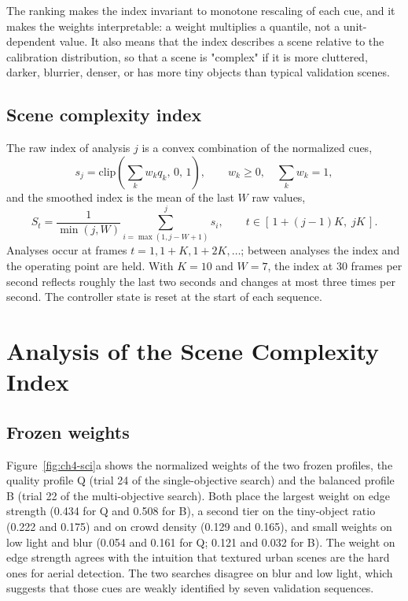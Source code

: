 The ranking makes the index invariant to monotone rescaling of each cue, and it makes the weights interpretable: a weight multiplies a quantile, not a unit-dependent value. It also means that the index describes a scene relative to the calibration distribution, so that a scene is "complex" if it is more cluttered, darker, blurrier, denser, or has more tiny objects than typical validation scenes.

\subsection{Scene complexity index}
The raw index of analysis $j$ is a convex combination of the normalized cues,
\begin{equation}
s_j = \mathrm{clip}\left(\sum_{k} w_k q_k,\, 0,\, 1\right), \qquad w_k \ge 0,\quad \sum_k w_k = 1,
\label{eq:ch4-sci}
\end{equation}
and the smoothed index is the mean of the last $W$ raw values,
\begin{equation}
S_t = \frac{1}{\min(j,W)} \sum_{i=\max(1,j-W+1)}^{j} s_i, \qquad t \in [\,1+(j-1)K,\; jK\,].
\label{eq:ch4-smooth}
\end{equation}
Analyses occur at frames $t=1, 1+K, 1+2K, \ldots$; between analyses the index and the operating point are held. With $K=10$ and $W=7$, the index at 30 frames per second reflects roughly the last two seconds and changes at most three times per second. The controller state is reset at the start of each sequence.

\section{Analysis of the Scene Complexity Index}\label{sec:ch4-sci}

\subsection{Frozen weights}
Figure~\ref{fig:ch4-sci}a shows the normalized weights of the two frozen profiles, the quality profile Q (trial 24 of the single-objective search) and the balanced profile B (trial 22 of the multi-objective search). Both place the largest weight on edge strength (0.434 for Q and 0.508 for B), a second tier on the tiny-object ratio (0.222 and 0.175) and on crowd density (0.129 and 0.165), and small weights on low light and blur (0.054 and 0.161 for Q; 0.121 and 0.032 for B). The weight on edge strength agrees with the intuition that textured urban scenes are the hard ones for aerial detection. The two searches disagree on blur and low light, which suggests that those cues are weakly identified by seven validation sequences.


